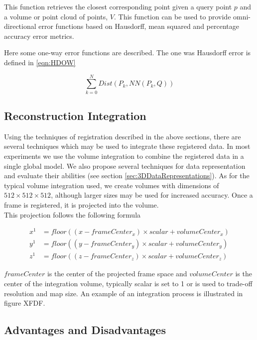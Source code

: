This function retrieves the closest corresponding point given a query point $p$ and a volume or point cloud of points, $V$. This function can be used to provide omni-directional error functions based on Hausdorff, mean squared and percentage accuracy error metrics.

Here some one-way error functions are described. The one was Hausdorff error is defined in \ref{eqn:HDOW} 

\begin{equation} \label{eqn:HDOW}
\sum_{k=0}^{N} Dist(P_k, NN(P_k, Q))
\end{equation}

\subsection{Reconstruction Integration}

Using the techniques of registration described in the above sections, there are several techniques which may be used to integrate these registered data. In most experiments we use the volume integration to combine the registered data in a single global model. We also propose several techniques for data representation and evaluate their abilities (see section \ref{sec:3DDataRepresentations}). As for the typical volume integration used, we create volumes with dimensions of $512\times 512\times 512$, although larger sizes may be used for increased accuracy. Once a frame is registered, it is projected into the volume. \\

This projection follows the following formula


\begin{equation} \label{eqn:volIntegration}
\begin{split}
x^{1} & = floor((x - frameCenter_x) \times scalar + volumeCenter_x) \\
y^{1} & = floor((y - frameCenter_y) \times scalar + volumeCenter_y) \\
z^{1} & = floor((z - frameCenter_z) \times scalar + volumeCenter_z)
\end{split}
\end{equation}

$frameCenter$ is the center of the projected frame space and $volumeCenter$ is the center of the integration volume, typically scalar is set to 1 or is used to trade-off resolution and map size. An example of an integration process is illustrated in figure XFDF. 


\subsection{Advantages and Disadvantages}



